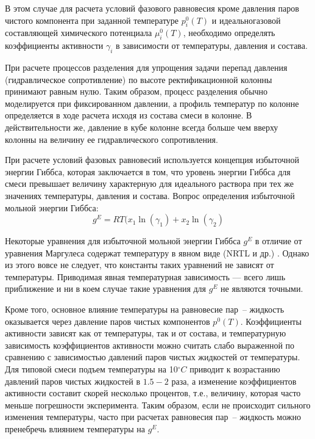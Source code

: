 В этом случае для расчета условий фазового равновесия кроме давления паров чистого компонента при заданной температуре $p_i^0(T)$ и идеальногазовой составляющей химического потенциала $\mu_i^0(T)$, необходимо определять коэффициенты активности $\gamma_i$ в зависимости от температуры, давления и состава.

При расчете процессов разделения для упрощения задачи перепад давления (гидравлическое сопротивление) по высоте ректификационной колонны принимают равным нулю. Таким образом, процесс разделения обычно моделируется при фиксированном давлении, а профиль температур по колонне определяется в ходе расчета исходя из состава смеси в колонне. В действительности же, давление в кубе колонне всегда больше чем вверху колонны на величину ее гидравлического сопротивления. 

При расчете условий фазовых равновесий используется концепция избыточной энергии Гиббса, которая заключается в том, что уровень энергии Гиббса для смеси превышает величину характерную для идеального раствора при тех же значениях температуры, давления и состава. Вопрос определения избыточной мольной энергии Гиббса:
\begin{equation}
	g^E=RT(x_1\ln (\gamma_1) +x_2 \ln(\gamma_2)
\end{equation}

Некоторые уравнения для избыточной мольной энергии Гиббса $g^E$ в отличие от уравнения Маргулеса содержат температуру в явном виде (NRTL и др.) \cite{rid1982,yelles1989}. Однако из этого вовсе не следует, что константы таких уравнений не зависят от температуры. Приводимая явная температурная зависимость --- всего лишь приближение и ни в коем случае такие уравнения для $g^E$ не являются точными.

Кроме того, основное влияние температуры на равновесие пар~-- жидкость оказывается через давление паров чистых компонентов $p^0(T)$. Коэффициенты активности зависят как от температуры, так и от состава, и температурную зависимость коэффициентов активности можно считать слабо выраженной по сравнению с зависимостью давлений паров чистых жидкостей от температуры. Для типовой смеси подъем температуры на 10$\mathrm{^\circ}C$ приводит к возрастанию давлений паров чистых жидкостей в $1.5 - 2$ раза, а изменение коэффициентов активности составит скорей несколько процентов, т.е., величину, которая часто меньше погрешности эксперимента. Таким образом, если не происходит сильного изменения температуры, часто при расчетах равновесия пар~-- жидкость можно пренебречь влиянием температуры на $g^E$.
 
